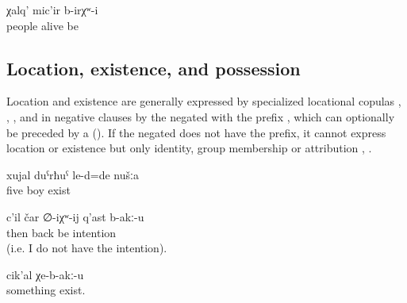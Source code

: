  \begin{exe}
	\ex	\label{ex:peopleusedtobealive}
	\gll	χalq'	mic'ir	b-irχʷ-i\\
		people	alive	be\\
	\glt	{}
\end{exe}



\subsection{Location, existence, and possession}
\label{ssec:Location, existence, and possession}

Location and existence are generally expressed by specialized locational copulas , , , and in negative clauses by the negated  with the  prefix , which can optionally be preceded by a   (). If the negated  does not have the  prefix, it cannot express location or existence but only identity, group membership or attribution , . 

\begin{exe}
	\ex	\label{ex:We were five guys}
	\gll	xujal	duˁrħuˁ	le-d=de	nušːa\\
		five	boy	exist	\\
	\glt	{}
	

	\ex	\label{ex:There is no intention to go back}
	\gll	c'il	čar	∅-iχʷ-ij	q'ast	b-akː-u\\
		then	back	be	intention	\\
	\glt	{} (i.e. I do not have the intention).

	\ex	\label{ex:There is nothing more}
	\gll	cik'al	χe-b-akː-u\\
		something	exist.\\
	\glt	{}

\end{exe}

